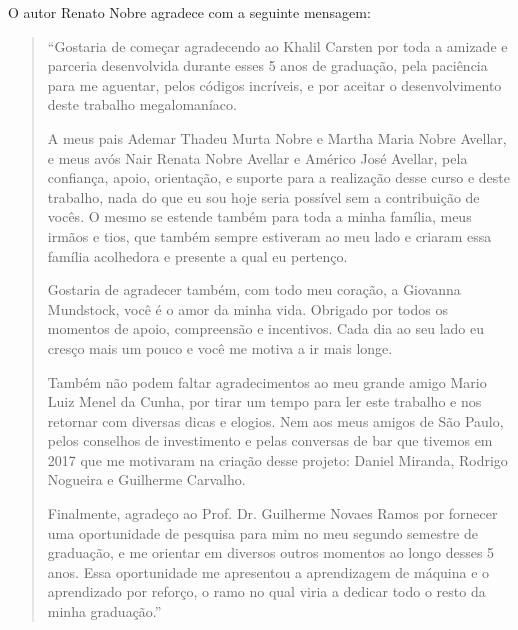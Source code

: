 \newpage

O autor Renato Nobre agradece com a seguinte mensagem: 

\vspace{5mm}

\begin{quote}

\forceindent ``Gostaria de começar agradecendo ao Khalil Carsten por toda a amizade e parceria desenvolvida durante esses 5 anos de graduação, pela paciência para me aguentar, pelos códigos incríveis, e por aceitar o desenvolvimento deste trabalho megalomaníaco.

\forceindent A meus pais Ademar Thadeu Murta Nobre e Martha Maria Nobre Avellar, e meus avós Nair Renata Nobre Avellar e Américo José Avellar, pela confiança, apoio, orientação, e suporte para a realização desse curso e deste trabalho, nada do que eu sou hoje seria possível sem a contribuição de vocês. O mesmo se estende também para toda a minha família, meus irmãos e tios, que também sempre estiveram ao meu lado e criaram essa família acolhedora e presente a qual eu pertenço. 

\forceindent Gostaria de agradecer também, com todo meu coração, a Giovanna Mundstock, você é o amor da minha vida. Obrigado por todos os momentos de apoio, compreensão e incentivos. Cada dia ao seu lado eu cresço mais um pouco e você me motiva a ir mais longe.

\forceindent Também não podem faltar agradecimentos ao meu grande amigo Mario Luiz Menel da Cunha, por tirar um tempo para ler este trabalho e nos retornar com diversas dicas e elogios. Nem aos meus amigos de São Paulo, pelos conselhos de investimento e pelas conversas de bar que tivemos em 2017 que me motivaram na criação desse projeto: Daniel Miranda, Rodrigo Nogueira e Guilherme Carvalho. 

\forceindent Finalmente, agradeço ao Prof. Dr. Guilherme Novaes Ramos por fornecer uma oportunidade de pesquisa para mim no meu segundo semestre de graduação, e me orientar em diversos outros momentos ao longo desses 5 anos. Essa oportunidade me apresentou a aprendizagem de máquina e o aprendizado por reforço, o ramo no qual viria a dedicar todo o resto da minha graduação.''
\end{quote}

\vspace{90mm}